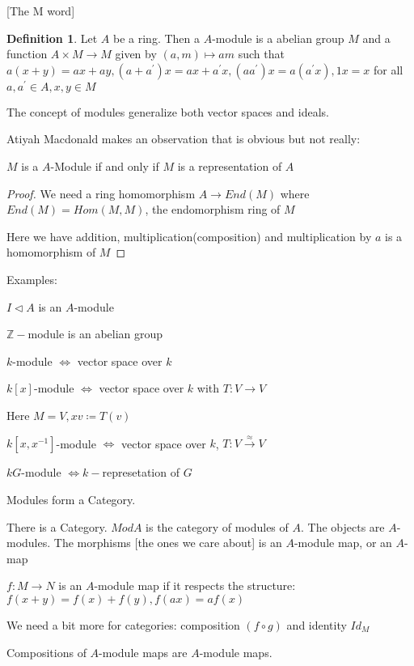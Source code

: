 \documentclass{article}
\theoremstyle{definition}
\newtheorem{definition}{Definition}
\begin{document}
[The M word]

\begin{definition}
    Let \(A\) be a ring. Then a \(A\)-module is a abelian group \(M\) and a function \(A\times M\to M\) given by \((a,m)\mapsto am\) such that \(a(x+y)=ax+ay,(a+a^{\prime} )x=ax+a^{\prime} x, (a a^{\prime})x = a(a^{\prime} x),1x=x\) for all \(a,a^{\prime} \in A,x,y\in M\) 
\end{definition}

The concept of modules generalize both vector spaces and ideals.

Atiyah Macdonald makes an observation that is obvious but not really:

\(M\) is a \(A\)-Module if and only if \(M\) is a representation of \(A\) 

\begin{proof}
    We need a ring homomorphism \(A\to End(M)\) where \(End(M)=Hom(M,M)\), the endomorphism ring of \(M\)

    Here we have addition, multiplication(composition) and multiplication by \(a\) is a homomorphism of \(M\) 

\end{proof}

Examples:

\(I\triangleleft A\) is an \(A\)-module

\(\mathbb{Z}-\)module is an abelian group

\(k\)-module \(\iff\)  vector space over \(k\) 

\(k[x]\)-module \(\iff\) vector space over \(k\) with \(T:V\to V\)

Here \(M=V,xv\coloneqq T(v)\) 

\(k[x,x ^{-1}]\)-module \(\iff\) vector space over \(k\), \(T:V\overset{\approx}{ \to } V\) 

\(kG\)-module \(\iff k-\)represetation of \(G\)

Modules form a Category.

There is a Category. \(Mod A\) is the category of modules of \(A\). The objects are \(A\)-modules. The morphisms [the ones we care about] is an \(A\)-module map, or an \(A\)-map

\(f:M\to N\) is an \(A\)-module map if it respects the structure: \(f(x+y)=f(x)+f(y),f(ax)=af(x)\) 

We need a bit more for categories: composition \((f\circ g)\)  and identity \(Id_M\) 

Compositions of \(A\)-module maps are \(A\)-module maps.
\end{document}
